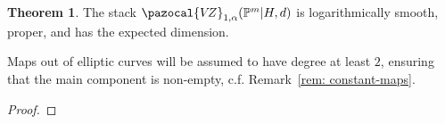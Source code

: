\documentclass[11pt]{amsart}
\newcommand{\PP}{\mathbb P}
\newcommand{\VZ}{\pazocal{V\!Z}}
\renewcommand{\to}{\rightarrow}
\newcommand{\bcd}{\begin{center}\begin{tikzcd}}
\newcommand{\ecd}{\end{tikzcd}\end{center}}
\theoremstyle{definition}
\newtheorem{thm}{Theorem}[section]
\theoremstyle{definition}
\begin{document}
\begin{thm}\label{thm: log-smoothness}
The stack $\VZ_{1,\alpha}(\mathbb P^m|H,d)$ is logarithmically smooth, proper, and has the expected dimension.
\end{thm}

Maps out of elliptic curves will be assumed to have degree at least $2$, ensuring that the main component is non-empty, c.f. Remark~\ref{rem: constant-maps}. 

\begin{proof}
\begin{comment}
We examine the geometry of the space of maps to $(\PP^m|H)$ by utilising the forgetful morphism
\[
\nu\colon \VZ_{1,\alpha}(\mathbb P^m|H,d)\to \VZ_{1,n}(\mathbb P^m,d),
\]
which remembers only the stabilisation of the collapsed map. To see that such a forgetful morphism exists, we have already observed that, for a map $[C\to \mathbb P^m[s]\to \mathbb P^m]$, the stabilised composite map is certainly centrally aligned; moreover, it satisfies the factorisation condition by assumption.

The moduli space $\VZ_{1,\alpha}(\mathbb P^m|H,d)$ is proper. Indeed, the verification of the valuative criterion follows from Vakil's Lemma~\cite[Lemma~5.9]{Vre}. A direct proof that the factorisation property is a closed condition may be found in~\cite[Theorem~4.3]{RSPW}.

We come to logarithmic smoothness. If the elliptic curve does not map into higher level, then deformations of the map are unobstructed exactly as in~\cite[Section~4.5]{RSPW}.

Assume now that the elliptic curve maps into higher level. Note that the relative logarithmic tangent bundle of the expansion, over the base $\mathbb P^m$ is a trivial line bundle of rank $1$, as the fibres are toric. Consider an $S$-family of maps. After replacing the source $C$ by a destabilisation, we have maps
\bcd
C \ar[r] & \overline{C}_F \ar[r] \ar[d] & \overline{C}_B \ar[d] \\
& \mathbb P^m[s] \ar[r] & \mathbb P^m
\ecd
factoring completely. Let $f_B$ and $f$ be the maps from $C$ to the collapsed and expanded target respectively. Examining the morphism $\nu$, we see that there is a map
\[
\mathrm{Def}(C,f_B)\to \mathrm{Obs}(f/(C,f_B)) = H^1(\overline{C}_F,\mathcal O_{\overline{C}_F}),
\]
where the former is the space of logarithmic deformations of the curve and map to the collapsed target, as a centrally aligned map satisfying simple factorisation.


\end{comment}
\end{proof}
\end{document}

